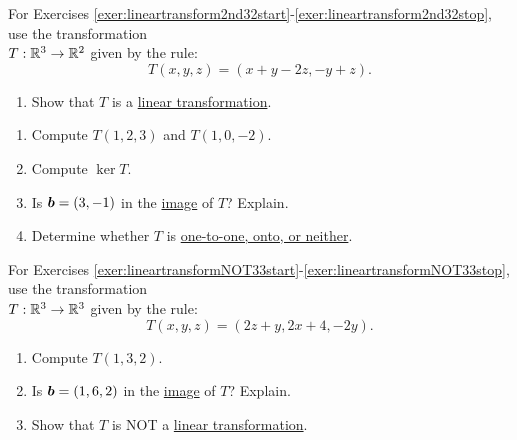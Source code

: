 \begin{multicols}{2}
\noindent For Exercises \ref{exer:lineartransform2nd32start}-\ref{exer:lineartransform2nd32stop}, use the transformation\\ $T : \mathbb{R}^3 \to \mathbb{R}^2$ given by the rule:
\[T(x, y, z) = (x+y-2z, -y+z).\] 
\begin{enumerate}[!HW!]
\item\label{exer:lineartransform2nd32start} Show that $T$ is a \hyperref[def:linear]{linear transformation}.
\end{enumerate}
\begin{enumerate}[!HW!, label=$\spadesuit$ \arabic*., ref=\arabic*]
\item Compute $T(1, 2, 3)$ and $T(1,0,-2)$.
\item Compute \hyperref[def:linear]{$\ker T$}.
\item Is $\boldsymbol b = (3, -1)$ in the \hyperref[def:linear]{image} of $T$? Explain. 
\item\label{exer:lineartransform2nd32stop} Determine whether $T$ is \hyperref[def:injective]{one-to-one, onto, or neither}.
\end{enumerate}\columnbreak

\noindent For Exercises \ref{exer:lineartransformNOT33start}-\ref{exer:lineartransformNOT33stop}, use the transformation\\ $T : \mathbb{R}^3 \to \mathbb{R}^3$ given by the rule:
\[T(x, y, z) = (2z+y, 2x+4, -2y).\] 
\begin{enumerate}[!HW!]
\item\label{exer:lineartransformNOT33start} Compute $T(1,3,2)$. %
\item Is $\boldsymbol b = (1,6,2)$ in the \hyperref[def:linear]{image} of $T$? Explain. 
\item\label{exer:lineartransformNOT33stop} Show that $T$ is NOT a \hyperref[def:linear]{linear transformation}.
\end{enumerate}
\end{multicols}\vspace{ 5 pt}

